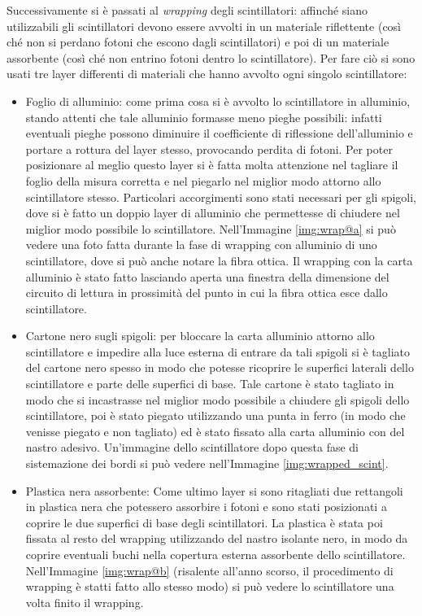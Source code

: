 Successivamente si è passati al \textit{wrapping} degli scintillatori: affinché siano utilizzabili gli scintillatori devono essere avvolti in un materiale riflettente
(così ch\'e non si perdano fotoni che escono dagli scintillatori) e poi di un materiale assorbente (così ch\'e non entrino fotoni dentro lo scintillatore). Per fare
ciò si sono usati tre layer differenti di materiali che hanno avvolto ogni singolo scintillatore:
\begin{itemize}
\item Foglio di alluminio: come prima cosa si è avvolto lo scintillatore in alluminio, stando attenti che tale alluminio formasse meno pieghe possibili: infatti eventuali pieghe
possono diminuire il coefficiente di riflessione dell'alluminio e portare a rottura del layer stesso, provocando perdita di fotoni. Per poter posizionare al meglio
questo layer si è fatta molta attenzione nel tagliare il foglio della misura corretta e nel piegarlo nel miglior  modo attorno allo scintillatore stesso. Particolari
accorgimenti sono stati necessari per gli spigoli, dove si è fatto un doppio layer di alluminio che permettesse di chiudere nel miglior modo possibile lo
scintillatore. Nell'Immagine \ref{img:wrap@a} si può vedere una foto fatta durante la fase di wrapping con alluminio di uno scintillatore, dove si può anche notare la fibra
ottica. Il wrapping con la carta alluminio è stato fatto lasciando aperta una finestra della dimensione del circuito di lettura in prossimità del punto in cui la fibra
ottica esce dallo scintillatore.


\item Cartone nero sugli spigoli: per bloccare la carta alluminio attorno allo scintillatore e impedire alla luce esterna di entrare da tali spigoli si è tagliato del cartone
nero spesso in modo che potesse ricoprire le superfici laterali dello scintillatore e parte delle superfici di base. Tale cartone è stato tagliato in modo che si incastrasse
nel miglior modo possibile a chiudere gli spigoli dello scintillatore, poi è stato piegato utilizzando una punta in ferro (in modo che venisse piegato
e non tagliato) ed è stato fissato alla carta alluminio con del nastro adesivo. Un'immagine dello scintillatore dopo questa fase di sistemazione dei bordi si può vedere
nell'Immagine \ref{img:wrapped_scint}.


\item Plastica nera assorbente: Come ultimo layer si sono ritagliati due rettangoli in plastica nera che potessero assorbire i fotoni e sono stati posizionati a coprire
le due superfici di base degli scintillatori. La plastica è stata poi fissata al resto del wrapping utilizzando del nastro isolante nero, in modo da coprire eventuali buchi
nella copertura esterna assorbente dello scintillatore. Nell'Immagine \ref{img:wrap@b} (risalente all'anno scorso, il procedimento di wrapping è statti fatto
allo stesso modo) si può vedere lo scintillatore una volta finito il wrapping.


\end{itemize}
